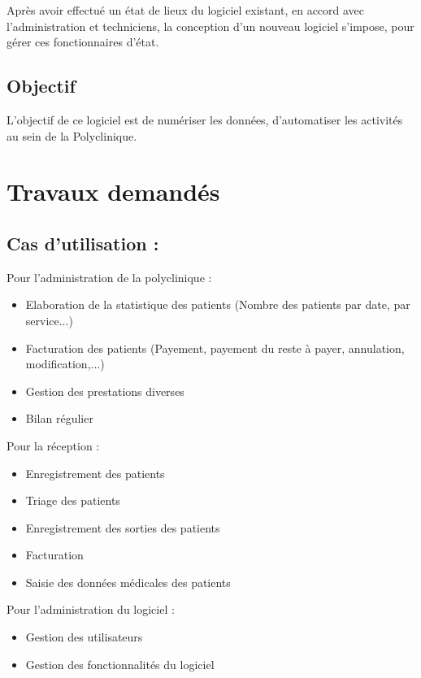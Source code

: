 \documentclass[11pt]{article}
\begin{document}
		Après avoir effectué un état de lieux du logiciel existant, en accord avec l’administration et techniciens, la conception d’un nouveau logiciel s’impose, pour gérer ces fonctionnaires d’état.
	
	\subsection*{Objectif}

	L’objectif de ce logiciel est de numériser les données, d’automatiser les activités au sein de la Polyclinique. 
	\section*{Travaux demandés}
		
		\subsection*{Cas d'utilisation :}
		Pour l'administration de la polyclinique :
			\begin{itemize}
				\item 	Elaboration de la statistique des patients (Nombre des patients par date, par service...)
				\item 	Facturation des patients (Payement, payement du reste à payer, annulation, modification,...)
				\item 	Gestion des prestations diverses
				\item Bilan régulier
				
			\end{itemize}
			
			
			Pour la réception :
			\begin{itemize}
				\item 	Enregistrement des patients
				\item 	Triage des patients
				\item  	Enregistrement des sorties des patients
				\item  	Facturation
				\item   Saisie des données médicales des patients
			\end{itemize}
			
			Pour l'administration du logiciel :
		
		\begin{itemize}
			\item Gestion des utilisateurs
			\item Gestion des fonctionnalités du logiciel
		\end{itemize}
				
\end{document}

